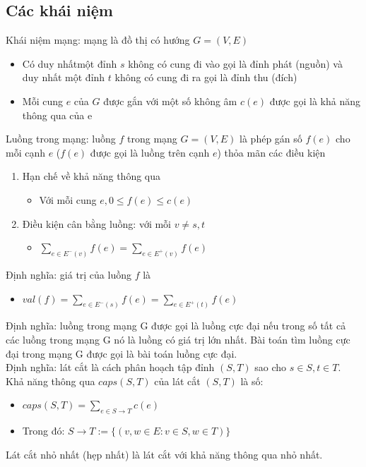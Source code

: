 \subsection{Các khái niệm}
Khái niệm mạng: mạng là đồ thị có hướng $G = (V, E)$
\begin{itemize}
    \item Có duy nhấtmột đỉnh $s$ không có cung đi vào gọi là đỉnh phát (nguồn) và duy nhất một đỉnh $t$ không có cung đi ra gọi là đỉnh thu (đích)
    \item Mỗi cung $e$ của $G$ được gắn với một số không âm $c(e)$ được gọi là khả năng thông qua của e
\end{itemize}
Luồng trong mạng: luồng $f$ trong mạng $G = (V, E)$ là phép gán số $f(e)$ cho mỗi cạnh $e$ ($f(e)$ được gọi là luồng trên cạnh $e$) thỏa mãn các điều kiện
\begin{enumerate}
    \item Hạn chế về khả năng thông qua 
    \begin{itemize}
        \item Với mỗi cung $e, 0 \leq f(e) \leq c(e)$
    \end{itemize}
    \item Điều kiện cân bằng luồng: với mỗi $v \neq s, t$
    \begin{itemize}
        \item $\sum_{e \in E^-(v)} f(e) = \sum_{e \in E^+(v)} f(e)$
    \end{itemize}
\end{enumerate}
Định nghĩa: giá trị của luồng $f$ là
\begin{itemize}
    \item $val(f) = \sum_{e \in E^-(s)} f(e) = \sum_{e \in E^+(t)} f(e)$
\end{itemize}
Định nghĩa: luồng trong mạng G được gọi là luồng cực đại nếu trong số tất cả các luồng trong mạng G
nó là luồng có giá trị lớn nhất. Bài toán tìm luồng cực đại trong mạng G được gọi là bài toán luồng cực
đại.
\\Định nghĩa: lát cắt là cách phân hoạch tập đỉnh $(S, T)$ sao cho $s \in S, t \in T$.
\\Khả năng thông qua $caps(S, T)$ của lát cắt $(S, T)$ là số:
\begin{itemize}
    \item $caps(S, T) = \sum_{e \in S \rightarrow T} c(e)$
    \item Trong đó: $S \rightarrow T := \{(v, w \in E: v \in S, w \in T)\}$
\end{itemize}
Lát cắt nhỏ nhất (hẹp nhất) là lát cắt với khả năng thông qua nhỏ nhất.
